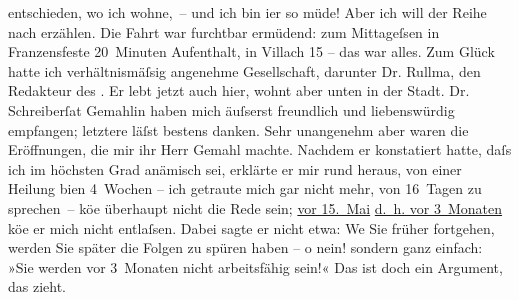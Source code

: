 \begin{ledgroupsized}[t]{13cm}
               entschieden, wo ich wohne, – und ich bin i{\geminationm}er so müde!
               Aber ich will der Reihe nach erzählen.\pend
           \pstart
           Die Fahrt war furchtbar ermüdend: zum Mittageſsen in Franzensfeste 20 Minuten Aufenthalt, in Villach 15 – das war alles. Zum Glück hatte ich verhältnismäſsig angenehme
               Gesellschaft, darunter Dr. Rullma{\geminationn}, den Redakteur des \label{K_L00176-2v}\label{K_L00176-2h}. Er lebt jetzt
               auch hier, wohnt aber unten in der Stadt.\pend
           \pstart
           Dr. Schreiberſa{\geminationm}t Gemahlin haben mich äuſserst freundlich und
               liebenswürdig empfangen; letztere läſst bestens danken. Sehr unangenehm aber waren
               die Eröffnungen, die mir ihr Herr Gemahl machte. Nachdem er konstatiert hatte, daſs ich im höchsten Grad
               anämisch sei, erklärte er mir rund heraus, von einer Heilung bi{\geminationn}en 4 Wochen – ich getraute mich gar nicht mehr, von
               16 Tagen zu sprechen – kö{\geminationn}e überhaupt nicht die Rede
               sein; \uline{vor 15. Mai}{ }{\pb}\uline{d. h. vor 3 Monaten} kö{\geminationn}e
               er mich nicht entlaſsen. Dabei sagte er nicht etwa: We{\geminationn}
               Sie früher fortgehen, werden Sie später die Folgen zu spüren haben – o nein! sondern
               ganz einfach: »Sie werden vor 3 Monaten nicht arbeitsfähig sein!« Das ist doch ein
               Argument, das zieht.\pend

\end{ledgroupsized}
